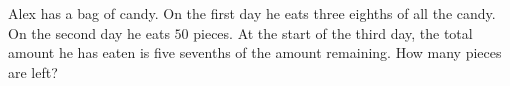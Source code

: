 Alex has a bag of candy. On the first day he eats three eighths of all the candy. On the second day he eats $50$ pieces. At the start of the third day, the total amount he has eaten is five sevenths of the amount remaining. How many pieces are left?
